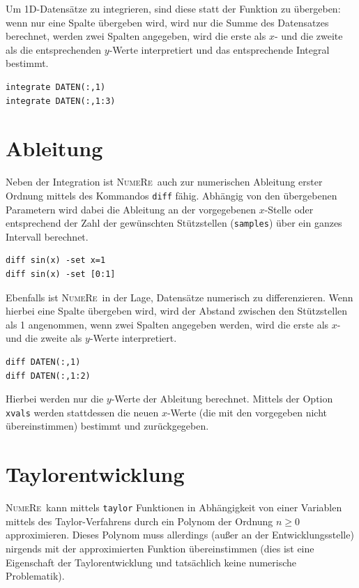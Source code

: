 \documentclass[DIV=14,headsepline,footsepline]{scrbook}
\newcommand{\NR}{\textsc{Nu\-me\-Re}}
\begin{document}
				Um 1D-Datensätze zu integrieren, sind diese statt der Funktion zu übergeben: wenn nur eine Spalte übergeben wird, wird nur die Summe des Datensatzes berechnet, werden zwei Spalten angegeben, wird die erste als $x$- und die zweite als die entsprechenden $y$-Werte interpretiert und das entsprechende Integral bestimmt.
				\begin{lstlisting}
integrate DATEN(:,1)
integrate DATEN(:,1:3)
				\end{lstlisting}
				
			\section{Ableitung}
				Neben der Integration ist \NR\ auch zur numerischen Ableitung erster Ordnung mittels des Kommandos \verb+diff+ fähig. Abhängig von den übergebenen Parametern wird dabei die Ableitung an der vorgegebenen $x$-Stelle oder entsprechend der Zahl der gewünschten Stützstellen (\verb+samples+) über ein ganzes Intervall berechnet.
				\begin{lstlisting}
diff sin(x) -set x=1
diff sin(x) -set [0:1]
				\end{lstlisting}
				
				Ebenfalls ist \NR\ in der Lage, Datensätze numerisch zu differenzieren. Wenn hierbei eine Spalte übergeben wird, wird der Abstand zwischen den Stützstellen als 1 angenommen, wenn zwei Spalten angegeben werden, wird die erste als $x$- und die zweite als $y$-Werte interpretiert.
				\begin{lstlisting}
diff DATEN(:,1)
diff DATEN(:,1:2)
				\end{lstlisting}
				Hierbei werden nur die $y$-Werte der Ableitung berechnet. Mittels der Option \verb+xvals+ werden stattdessen die neuen $x$-Werte (die mit den vorgegeben nicht übereinstimmen) bestimmt und zurückgegeben.
				
			\section{Taylorentwicklung}
				\NR\ kann mittels \verb+taylor+ Funktionen in Abhängigkeit von einer Variablen mittels des Taylor-Verfahrens durch ein Polynom der Ordnung $n \geq 0$ approximieren. Dieses Polynom muss allerdings (außer an der Entwicklungsstelle) nirgends mit der approximierten Funktion übereinstimmen (dies ist eine Eigenschaft der Taylorentwicklung und tatsächlich keine numerische Problematik).
	
\end{document}
